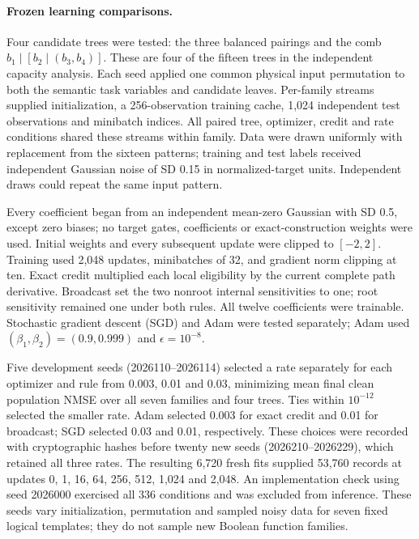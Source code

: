 \paragraph{Frozen learning comparisons.}
Four candidate trees were tested: the three balanced pairings and the comb
$b_1\mid[b_2\mid(b_3,b_4)]$. These are four of the fifteen trees in the independent
capacity analysis. Each seed applied one common physical input permutation
to both the semantic task variables and candidate leaves. Per-family streams
supplied initialization, a 256-observation training cache, 1,024 independent
test observations and minibatch indices. All paired tree, optimizer, credit
and rate conditions shared these streams within family. Data were drawn
uniformly with replacement from the sixteen patterns; training and test
labels received independent Gaussian noise of SD 0.15 in normalized-target
units. Independent draws could repeat the same input pattern.

Every coefficient began from an independent mean-zero Gaussian with SD 0.5,
except zero biases; no target gates, coefficients or exact-construction
weights were used. Initial weights and every subsequent update were clipped
to $[-2,2]$. Training used 2,048 updates, minibatches of 32, and gradient norm
clipping at ten. Exact credit multiplied each local eligibility by the
current complete path derivative. Broadcast set the two nonroot internal
sensitivities to one; root sensitivity remained one under both rules. All
twelve coefficients were trainable. Stochastic gradient descent (SGD) and Adam were tested separately;
Adam used $(\beta_1,\beta_2)=(0.9,0.999)$ and $\epsilon=10^{-8}$.

Five development seeds (2026110--2026114) selected a rate separately for each
optimizer and rule from 0.003, 0.01 and 0.03, minimizing mean final clean
population NMSE over all seven families and four trees. Ties within
$10^{-12}$ selected the smaller rate. Adam selected 0.003 for exact credit
and 0.01 for broadcast; SGD selected 0.03 and 0.01, respectively. These choices were recorded with cryptographic hashes before twenty new
seeds (2026210--2026229), which
retained all three rates. The resulting 6,720 fresh fits supplied 53,760
records at updates 0, 1, 16, 64, 256, 512, 1,024 and 2,048. An implementation check using seed 2026000 exercised all 336 conditions
and was excluded from inference. These seeds vary initialization,
permutation and sampled noisy data for seven fixed logical templates;
they do not sample new Boolean function families.

